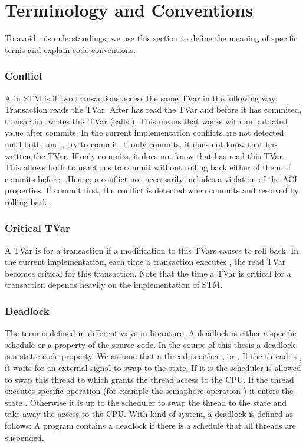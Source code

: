 \section{Terminology and Conventions}
\label{definitions}
To avoid misunderstandings, we use this section to define the meaning of specific terms and explain code conventions.

\subsubsection{Conflict}
A  in STM is if two transactions access the same TVar in the following way. Transaction  reads 
the TVar. After  has read the TVar and before it has commited, transaction  writes this TVar (calls ). 
This means that  works with an outdated value after  commits. In the current implementation
conflicts are not detected until both,  and , try to commit. If only  commits, it does not 
know that  has written the TVar. If only  commits, it does not know that  has read this TVar.
This allows both transactions to commit without rolling back either of them, if  commits before .
Hence, a conflict not necessarily includes a violation of the ACI properties.
If  commit first, the conflict is detected when  commits and resolved by rolling back .

\subsubsection{Critical TVar}
A TVar is  for a transaction  if a modification to this TVars causes  to roll back. In the current
implementation, each time a transaction executes , the read TVar becomes critical for this transaction. Note that the
time a TVar is critical for a transaction depends heavily on the implementation of STM. 

\subsubsection{Deadlock}
The term  is defined in different ways in literature. A deadlock is either a specific
schedule or a property of the source code. In the course of this thesis a deadlock
is a static code property. We assume that a thread is either ,  or .
If the thread is , it waits for an external signal to swap to the  state. If it
is  the scheduler is allowed to swap this thread to  which grants the thread access to
the CPU. If the thread executes specific operation (for example the semaphore operation ) it enters 
the state . Otherwise it is up to the scheduler to swap the thread to the  state and
take away the access to the CPU. With kind of system, a deadlock is defined as follows:
A program contains a deadlock if there is a schedule that all threads are suspended.

